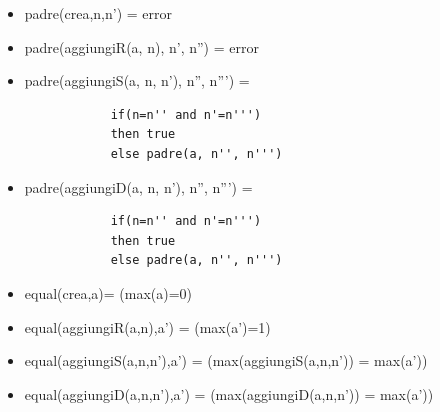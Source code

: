 \documentclass{article}
\begin{document}
	\begin{itemize}
		\item padre(crea,n,n') = error
		\item padre(aggiungiR(a, n), n', n'') = error
		\item padre(aggiungiS(a, n, n'), n'', n''') = 
		\begin{verbatim}
			if(n=n'' and n'=n''') 
			then true 
			else padre(a, n'', n''')
		\end{verbatim}
		\item padre(aggiungiD(a, n, n'), n'', n''') =
		\begin{verbatim}
			if(n=n'' and n'=n''') 
			then true 
			else padre(a, n'', n''')
		\end{verbatim}
		\item equal(crea,a)= (max(a)=0)
		\item equal(aggiungiR(a,n),a') = (max(a')=1)
		\item equal(aggiungiS(a,n,n'),a') = (max(aggiungiS(a,n,n')) = max(a'))
		\item equal(aggiungiD(a,n,n'),a') = (max(aggiungiD(a,n,n')) = max(a'))
	\end{itemize}
	\newpage
\end{document}
